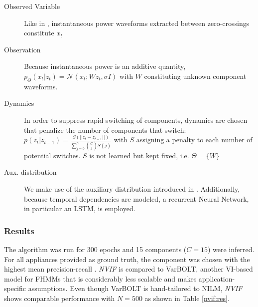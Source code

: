 \begin{description}%
\item[Observed Variable] Like in \cite{lange2018varbolt}, instantaneous power waveforms extracted between zero-crossings constitute $x_t$
\item[Observation] Because instantaneous power is an additive quantity, $p_\Theta(x_t|z_t) = \mathcal{N}(x_t; Wz_t, \sigma I)$ with $W$ constituting unknown component waveforms.
\item[Dynamics] In order to suppress rapid switching of components, dynamics are chosen that penalize the number of components that switch: $p(z_t | z_{t-1}) = \frac{S(||z_{t} - z_{t-1}||)}{\sum_{j=0}^C \binom{C}{j} S(j)}$ with $S$ assigning a penalty to each number of potential switches. $S$ is not learned but kept fixed, i.e. $\Theta = \{W\}$
\item[Aux. distribution] We make use of the auxiliary distribution introduced in \cite{lange2018factornet}. Additionally, because temporal dependencies are modeled, a recurrent Neural Network, in particular an LSTM, is employed.
\end{description}


\subsubsection{Results}
The algorithm was run for 300 epochs and 15 components ($C=15$) were inferred. For all appliances provided as ground truth, the component was chosen with the highest mean precision-recall \cite{kolter2012approximate}. \emph{NVIF} is compared to VarBOLT, another VI-based model for FHMMs that is considerably less scalable and makes application-specific assumptions. Even though VarBOLT is hand-tailored to NILM, \emph{NVIF} shows comparable performance with $N=500$ as shown in Table \ref{nvif:res}.

